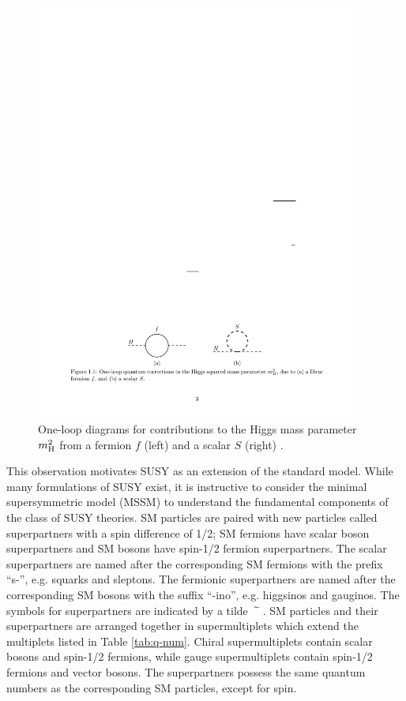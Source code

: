 \documentclass[12pt]{thesis}  %
\begin{document}
\begin{figure}[hbt]
\begin{center}
\includegraphics[width=0.95\textwidth]{figures/9709356v6-higgs-cancel.pdf}
\caption{One-loop diagrams for contributions to the Higgs mass parameter $m_{\mathrm{H}}^{2}$ from a fermion $f$ (left) and a scalar $S$ (right) \cite{Primer}.}
\label{fig:higgs-cancel}
\end{center}
\end{figure}

This observation motivates SUSY as an extension of the standard model. While many formulations of SUSY exist, it is instructive to consider the minimal supersymmetric model (MSSM) to understand the fundamental components of the class of SUSY theories. SM particles are paired with new particles called superpartners with a spin difference of 1/2; SM fermions have scalar boson superpartners and SM bosons have spin-1/2 fermion superpartners. The scalar superpartners are named after the corresponding SM fermions with the prefix ``s-'', e.g. squarks and sleptons. The fermionic superpartners are named after the corresponding SM bosons with the suffix ``-ino'', e.g. higgsinos and gauginos. The symbols for superpartners are indicated by a tilde $\widetilde{\hphantom{H}}$. SM particles and their superpartners are arranged together in supermultiplets which extend the multiplets listed in Table \ref{tab:q-num}. Chiral supermultiplets contain scalar bosons and spin-1/2 fermions, while gauge supermultiplets contain spin-1/2 fermions and vector bosons. The superpartners possess the same quantum numbers as the corresponding SM particles, except for spin.
\end{document}
